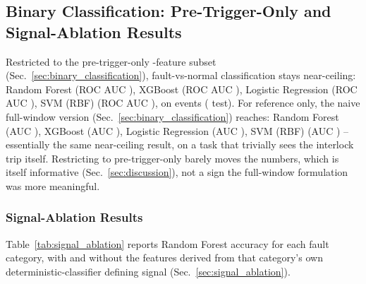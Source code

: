 \subsection{Binary Classification: Pre-Trigger-Only and Signal-Ablation Results}
\label{sec:binary_ablation_results}

Restricted to the pre-trigger-only \MetricZeroSixbPhaseOneBinaryPretriggerNFeatures{}-feature subset (Sec.~\ref{sec:binary_classification}), fault-vs-normal classification stays near-ceiling: Random Forest \MetricZeroSixbPhaseOneBinaryPretriggerRandomForestAccuracy{} (ROC AUC \MetricZeroSixbPhaseOneBinaryPretriggerRandomForestRocAuc), XGBoost \MetricZeroSixbPhaseOneBinaryPretriggerXgboostAccuracy{} (ROC AUC \MetricZeroSixbPhaseOneBinaryPretriggerXgboostRocAuc), Logistic Regression \MetricZeroSixbPhaseOneBinaryPretriggerLogisticRegressionAccuracy{} (ROC AUC \MetricZeroSixbPhaseOneBinaryPretriggerLogisticRegressionRocAuc), SVM (RBF) \MetricZeroSixbPhaseOneBinaryPretriggerSvmRbfAccuracy{} (ROC AUC \MetricZeroSixbPhaseOneBinaryPretriggerSvmRbfRocAuc), on \MetricZeroSixbPhaseOneBinaryPretriggerNEventsTotal{} events (\MetricZeroSixbPhaseOneBinaryPretriggerNEventsTest{} test). For reference only, the naive full-window version (Sec.~\ref{sec:binary_classification}) reaches: Random Forest \MetricZeroSixBinaryClassificationRandomForestAccuracy{} (AUC \MetricZeroSixBinaryClassificationRandomForestRocAuc), XGBoost \MetricZeroSixBinaryClassificationXgboostAccuracy{} (AUC \MetricZeroSixBinaryClassificationXgboostRocAuc), Logistic Regression \MetricZeroSixBinaryClassificationLogisticRegressionAccuracy{} (AUC \MetricZeroSixBinaryClassificationLogisticRegressionRocAuc), SVM (RBF) \MetricZeroSixBinaryClassificationSvmRbfAccuracy{} (AUC \MetricZeroSixBinaryClassificationSvmRbfRocAuc) -- essentially the same near-ceiling result, on a task that trivially sees the interlock trip itself. Restricting to pre-trigger-only barely moves the numbers, which is itself informative (Sec.~\ref{sec:discussion}), not a sign the full-window formulation was more meaningful.

\subsubsection{Signal-Ablation Results}

Table~\ref{tab:signal_ablation} reports Random Forest accuracy for each fault category, with and without the features derived from that category's own deterministic-classifier defining signal (Sec.~\ref{sec:signal_ablation}).

